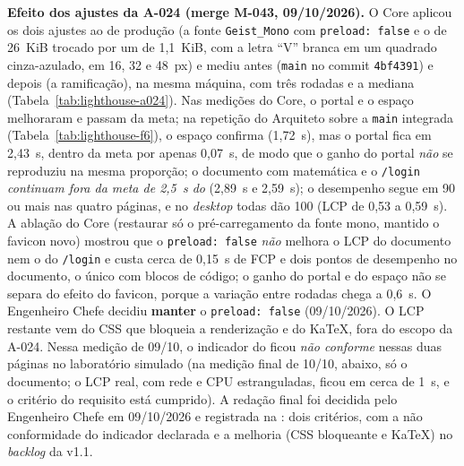\textbf{Efeito dos ajustes da A-024 (merge M-043, 09/10/2026).} O Core aplicou os dois ajustes ao  de produção (a fonte \texttt{Geist\_Mono} com \texttt{preload: false} e o  de 26~KiB trocado por um de 1,1~KiB, com a letra ``V'' branca em um quadrado cinza-azulado, em 16, 32 e 48~px) e mediu antes (\texttt{main} no commit \texttt{4bf4391}) e depois (a ramificação), na mesma máquina, com três rodadas e a mediana (Tabela~\ref{tab:lighthouse-a024}). Nas medições do Core, o portal e o espaço melhoraram e passam da meta; na repetição do Arquiteto sobre a \texttt{main} integrada (Tabela~\ref{tab:lighthouse-f6}), o espaço confirma (1,72~s), mas o portal fica em 2,43~s, dentro da meta por apenas 0,07~s, de modo que o ganho do portal \emph{não} se reproduziu na mesma proporção; o documento com matemática e o \texttt{/login} \emph{continuam fora da meta de 2,5~s do } (2,89~s e 2,59~s); o desempenho segue em 90 ou mais nas quatro páginas, e no \emph{desktop} todas dão 100 (LCP de 0,53 a 0,59~s). A ablação do Core (restaurar só o pré-carregamento da fonte mono, mantido o favicon novo) mostrou que o \texttt{preload: false} \emph{não} melhora o LCP do documento nem o do \texttt{/login} e custa cerca de 0,15~s de FCP e dois pontos de desempenho no documento, o único com blocos de código; o ganho do portal e do espaço não se separa do efeito do favicon, porque a variação entre rodadas chega a 0,6~s. O Engenheiro Chefe decidiu \textbf{manter} o \texttt{preload: false} (09/10/2026). O LCP restante vem do CSS que bloqueia a renderização e do KaTeX, fora do escopo da A-024. Nessa medição de 09/10, o indicador do  ficou \emph{não conforme} nessas duas páginas no laboratório simulado (na medição final de 10/10, abaixo, só o documento; o LCP real, com rede e CPU estranguladas, ficou em cerca de 1~s, e o critério do requisito está cumprido). A redação final foi decidida pelo Engenheiro Chefe em 09/10/2026 e registrada na : dois critérios, com a não conformidade do indicador declarada e a melhoria (CSS bloqueante e KaTeX) no \emph{backlog} da v1.1.

